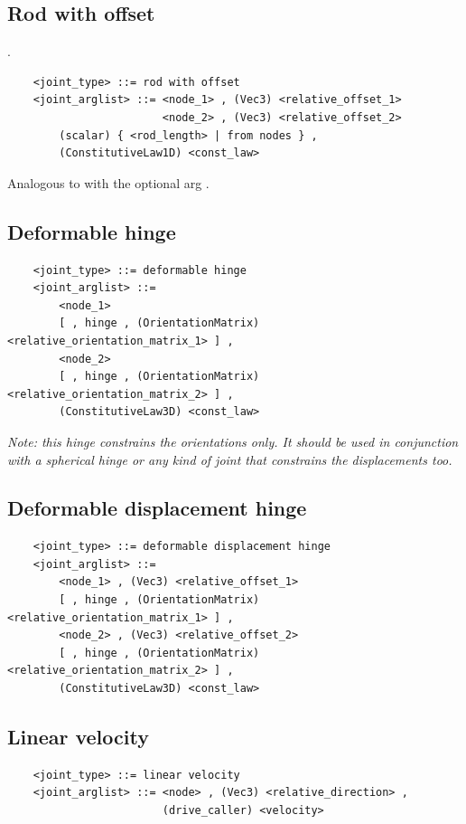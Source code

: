 \subsection{Rod with offset}\label{sec:RD-WITH-OFFSET}.
\begin{verbatim}
    <joint_type> ::= rod with offset
    <joint_arglist> ::= <node_1> , (Vec3) <relative_offset_1>
                        <node_2> , (Vec3) <relative_offset_2>
        (scalar) { <rod_length> | from nodes } ,
        (ConstitutiveLaw1D) <const_law>
\end{verbatim}
Analogous to  with the optional arg .

\subsection{Deformable hinge}
\begin{verbatim}
    <joint_type> ::= deformable hinge
    <joint_arglist> ::= 
        <node_1>
        [ , hinge , (OrientationMatrix) <relative_orientation_matrix_1> ] ,
        <node_2> 
        [ , hinge , (OrientationMatrix) <relative_orientation_matrix_2> ] ,
        (ConstitutiveLaw3D) <const_law>
\end{verbatim}
\emph{Note: this hinge constrains the orientations only.
    It should be used in conjunction with a spherical hinge or any kind of
    joint that constrains the displacements too.}

\subsection{Deformable displacement hinge}
\begin{verbatim}
    <joint_type> ::= deformable displacement hinge
    <joint_arglist> ::= 
        <node_1> , (Vec3) <relative_offset_1>
        [ , hinge , (OrientationMatrix) <relative_orientation_matrix_1> ] ,
        <node_2> , (Vec3) <relative_offset_2>
        [ , hinge , (OrientationMatrix) <relative_orientation_matrix_2> ] ,
        (ConstitutiveLaw3D) <const_law>
\end{verbatim}

\subsection{Linear velocity}
\begin{verbatim}
    <joint_type> ::= linear velocity
    <joint_arglist> ::= <node> , (Vec3) <relative_direction> , 
                        (drive_caller) <velocity>
\end{verbatim}

